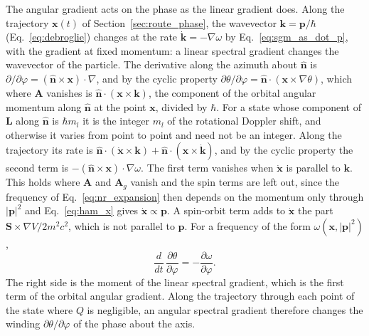 \documentclass[aps,prd,onecolumn,tightenlines,nofootinbib,notitlepage,11pt,floatfix]{revtex4-2}
\theoremstyle{indentedtheorem}
\begin{document}
The angular gradient acts on the phase as the linear gradient does. Along the trajectory $\mathbf{x}(t)$ of Section~\ref{sec:route_phase}, the wavevector $\mathbf{k}=\mathbf{p}/\hbar$ (Eq.~\eqref{eq:debroglie}) changes at the rate $\dot{\mathbf{k}}=-\nabla\omega$ by Eq.~\eqref{eq:sgm_as_dot_p}, with the gradient at fixed momentum: a linear spectral gradient changes the wavevector of the particle. The derivative along the azimuth about $\hat{\mathbf{n}}$ is $\partial/\partial\varphi=(\hat{\mathbf{n}}\times\mathbf{x})\cdot\nabla$, and by the cyclic property $\partial\theta/\partial\varphi=\hat{\mathbf{n}}\cdot(\mathbf{x}\times\nabla\theta)$, which where $\mathbf{A}$ vanishes is $\hat{\mathbf{n}}\cdot(\mathbf{x}\times\mathbf{k})$, the component of the orbital angular momentum along $\hat{\mathbf{n}}$ at the point $\mathbf{x}$, divided by $\hbar$. For a state whose component of $\mathbf{L}$ along $\hat{\mathbf{n}}$ is $\hbar m_l$ it is the integer $m_l$ of the rotational Doppler shift, and otherwise it varies from point to point and need not be an integer. Along the trajectory its rate is $\hat{\mathbf{n}}\cdot(\dot{\mathbf{x}}\times\mathbf{k})+\hat{\mathbf{n}}\cdot(\mathbf{x}\times\dot{\mathbf{k}})$, and by the cyclic property the second term is $-(\hat{\mathbf{n}}\times\mathbf{x})\cdot\nabla\omega$. The first term vanishes when $\dot{\mathbf{x}}$ is parallel to $\mathbf{k}$. This holds where $\mathbf{A}$ and $\mathbf{A}_g$ vanish and the spin terms are left out, since the frequency of Eq.~\eqref{eq:nr_expansion} then depends on the momentum only through $|\mathbf{p}|^2$ and Eq.~\eqref{eq:ham_x} gives $\dot{\mathbf{x}}\propto\mathbf{p}$. A spin-orbit term adds to $\dot{\mathbf{x}}$ the part $\mathbf{S}\times\nabla V/2m^2c^2$, which is not parallel to $\mathbf{p}$. For a frequency of the form $\omega(\mathbf{x},|\mathbf{p}|^2)$,
\begin{equation}
    \frac{d}{dt}\,\frac{\partial\theta}{\partial\varphi} = -\frac{\partial\omega}{\partial\varphi} .
    \label{eq:winding_rate}
\end{equation}
The right side is the moment of the linear spectral gradient, which is the first term of the orbital angular gradient. Along the trajectory through each point of the state where $Q$ is negligible, an angular spectral gradient therefore changes the winding $\partial\theta/\partial\varphi$ of the phase about the axis.
\end{document}
